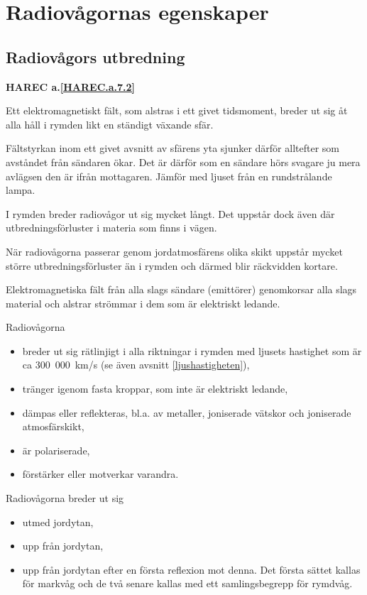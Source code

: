 \section{Radiovågornas egenskaper}
\label{radiovågornasegenskaper}

\subsection{Radiovågors utbredning}
\textbf{HAREC a.\ref{HAREC.a.7.2}\label{myHAREC.a.7.2}}

Ett elektromagnetiskt fält, som alstras i ett givet tidsmoment, breder
ut sig åt alla håll i rymden likt en ständigt växande sfär.

Fältstyrkan inom ett givet avsnitt av sfärens yta sjunker därför
alltefter som avståndet från sändaren ökar. Det är därför som en
sändare hörs svagare ju mera avlägsen den är ifrån mottagaren. Jämför
med ljuset från en rundstrålande lampa.

I rymden breder radiovågor ut sig mycket långt. Det uppstår dock även
där utbredningsförluster i materia som finns i vägen.

När radiovågorna passerar genom jordatmosfärens olika skikt uppstår
mycket större utbredningsförluster än i rymden och därmed blir
räckvidden kortare.

Elektromagnetiska fält från alla slags sändare (emittörer) genomkorsar
alla slags material och alstrar strömmar i dem som är elektriskt
ledande.

Radiovågorna
\begin{itemize}
\item breder ut sig rätlinjigt i alla riktningar i rymden med ljusets
  hastighet som är ca 300~000~km/s (se även avsnitt \ref{ljushastigheten}),
\item tränger igenom fasta kroppar, som inte är elektriskt ledande,
\item dämpas eller reflekteras, bl.a. av metaller, joniserade vätskor
  och joniserade atmosfärskikt,
\item är polariserade,
\item förstärker eller motverkar varandra.
\end{itemize}
Radiovågorna breder ut sig
\begin{itemize}
\item utmed jordytan,
\item upp från jordytan,
\item upp från jordytan efter en första reflexion mot denna.  Det
  första sättet kallas för markvåg och de två senare kallas med ett
  samlingsbegrepp för rymdvåg.
\end{itemize}

